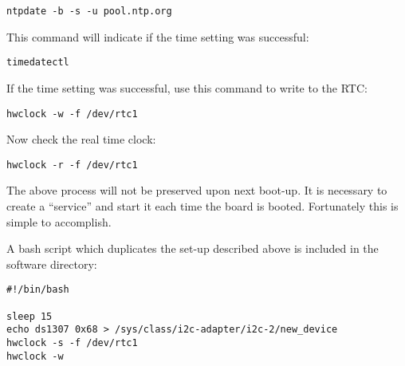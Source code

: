 \begin{verbatim}
ntpdate -b -s -u pool.ntp.org
\end{verbatim}

This command will indicate if the time setting was successful:

\begin{verbatim}
timedatectl
\end{verbatim}

If the time setting was successful, use this command to write to the RTC:

\begin{verbatim}
hwclock -w -f /dev/rtc1
\end{verbatim}

Now check the real time clock:

\begin{verbatim}
hwclock -r -f /dev/rtc1
\end{verbatim}

The above process will not be preserved upon next boot-up.  It is necessary to create a ``service'' and start it each time the board is booted.  Fortunately this is simple to accomplish.

A bash script which duplicates the set-up described above is included in the software directory:

\begin{verbatim}
#!/bin/bash

sleep 15
echo ds1307 0x68 > /sys/class/i2c-adapter/i2c-2/new_device
hwclock -s -f /dev/rtc1
hwclock -w
\end{verbatim}




